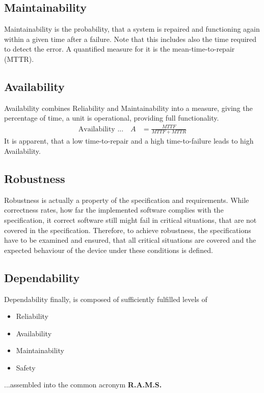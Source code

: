 \documentclass[master,english,smartquotes,apa]{hgbthesis}
\begin{document}
	\subsection{Maintainability}
	{Maintainability} is the probability, that a system is repaired and functioning again within a given time after a failure. Note that this includes also the time required to detect the error.
	A quantified measure for it is the mean-time-to-repair (MTTR).
	\subsection{Availability}
	{Availability} combines Reliability and Maintainability into a measure, giving the percentage of time, a unit is operational, providing full functionality.
		\begin{align*}
	\textrm{Availability ...} \quad A & = \frac{MTTF}{MTTF + MTTR}
		\end{align*}
	It is apparent, that a low time-to-repair and a high time-to-failure leads to high Availability.
	\subsection{Robustness}
		Robustness is actually a property of the specification and requirements. While correctness rates, how far the implemented software complies with the specification, it correct software still might fail in critical situations, that are not covered in the specification. Therefore, to achieve robustness, the specifications have to be examined and ensured, that all critical situations are covered and the expected behaviour of the device under these conditions is defined.
	\subsection{Dependability}
	{Dependability} finally, is composed of sufficiently fulfilled levels of \\
		\begin{itemize}
			\item Reliability
			\item Availability
			\item Maintainability
			\item Safety
		\end{itemize}
	...assembled into the common acronym {\bf R.A.M.S.}
	
\end{document}
